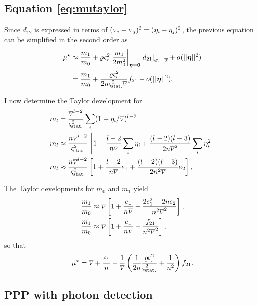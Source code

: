 \documentclass{pasa}
\begin{document}
\subsection{Equation \ref{eq:mutaylor}}
\label{ap:mutaylor}

Since $d_{12}$ is expressed in terms of $({\scriptstyle V}_i - {\scriptstyle V}_j)^2 = (\eta_i - \eta_j)^2$, the previous equation can be simplified in the second order as
\begin{align*}
    \mu^\star &\approx \frac{m_1}{m_0} 
                + \varrho\varsigma_\tau^2
                    \left.  \frac{m_1}{2m_0^2} \right|_{\boldsymbol{\eta} = \boldsymbol{0}} 
                    \left. d_{21}\right|_{\sigma_i = \overline{\sigma}} 
                + o(||\boldsymbol{\eta}||^2)\\
               &= \frac{m_1}{m_0} + \frac{\varrho\varsigma_\tau^2}{2n\varsigma_\text{stat.}^2\overline{{\scriptstyle V}}}  f_{21} + o(||\boldsymbol{\eta}||^2).
\end{align*}

I now determine the Taylor development for
\begin{align*}
    m_l &= \frac{\overline{{\scriptstyle V}}^{l-2}}{\varsigma_\text{stat.}^2} \sum_i (1 + \eta_i/\overline{{\scriptstyle V}})^{l-2}\\
    m_l &\approx \frac{n\overline{{\scriptstyle V}}^{l-2}}{\varsigma_\text{stat.}^2} \left[ 
                1 + \frac{l-2}{n\overline{{\scriptstyle V}}}\sum_i \eta_i 
               + \frac{(l-2)(l-3)}{2n\overline{{\scriptstyle V}}^2}\sum_i \eta_i^2\right]\\ 
    m_l &\approx \frac{n\overline{{\scriptstyle V}}^{l-2}}{\varsigma_\text{stat.}^2}\left[
            1 + \frac{l-2}{n\overline{{\scriptstyle V}}} e_1 
                + \frac{(l-2)(l-3)}{2n^2\overline{{\scriptstyle V}}} e_2 \right],
\end{align*}

The Taylor developments for $m_0$ and $m_1$ yield
\begin{align*}
   \frac{m_1}{m_0} &\approx \overline{{\scriptstyle V}}
    \left[ 1 + \frac{e_1}{n\overline{{\scriptstyle V}}} + \frac{2e_1^2 - 2n e_2}{n^2\overline{{\scriptstyle V}}^2}    \right],\\ 
   \frac{m_1}{m_0} &\approx \overline{{\scriptstyle V}}
    \left[ 1 + \frac{e_1}{n\overline{{\scriptstyle V}}} - \frac{f_{21}}{n^2\overline{{\scriptstyle V}}^2}    \right], 
\end{align*}
so that
\begin{equation*}
    \mu^\star = \overline{{\scriptstyle V}} + \frac{e_1}{n} 
                    - \frac1{\overline{{\scriptstyle V}}}
                      \left( \frac 1{2n}\frac{\varrho\varsigma_\tau^2}{\varsigma_\text{stat.}^2} + \frac 1{n^2} \right) 
                      f_{21}.
\end{equation*}

\subsection{PPP with photon detection}
\label{ap:photon}
\end{document}
